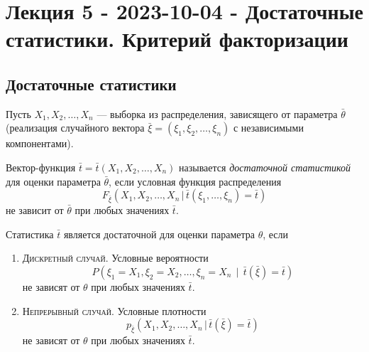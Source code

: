 \section{Лекция 5 - 2023-10-04 - Достаточные статистики. Критерий факторизации}
\subsection{Достаточные статистики}
Пусть $ X_1, X_2, \ldots, X_n $ --- выборка из распределения, зависящего от
параметра $ \bar \theta $ (реализация случайного вектора $ \bar \xi = (\xi_1,
\xi_2, \ldots, \xi_n) $ с независимыми компонентами).

\begin{definition}
  Вектор-функция $\bar t = \bar t(X_1, X_2, \dots, X_n)$ называется \emph{достаточной
	статистикой} для оценки параметра $\bar{\theta}$, если условная функция
	распределения
	\[
		F_{\bar \xi} (X_1, X_2, \dots, X_n\, | \,\bar{t} (\xi_1, \dots, \xi_n)
		= \bar t)
	\]
	не зависит от $\bar\theta$ при любых значениях $\bar t$. 
\end{definition}

\begin{remark*}
Статистика $ \bar t $ является достаточной для оценки параметра $ \theta $, если
\begin{enumerate}
	\item \textsc{Дискретный случай}. Условные вероятности 
	\[
			P(\xi_1 = X_1, \xi_2 = X_2, \ldots, \xi_n = X_n\, \mid \, \bar t(\bar \xi) = \bar
			t)
	\]
	не зависят от $ \theta $ при любых значениях $ \bar t $.
\item \textsc{Непрерывный случай}. Условные плотности  
\[
	p_{\bar \xi} (X_1, X_2, \ldots, X_n\, |\,\bar t(\bar \xi) = \bar t)
\]
не зависят от $ \theta $ при любых значениях $ \bar t $.
\end{enumerate}

\end{remark*}

